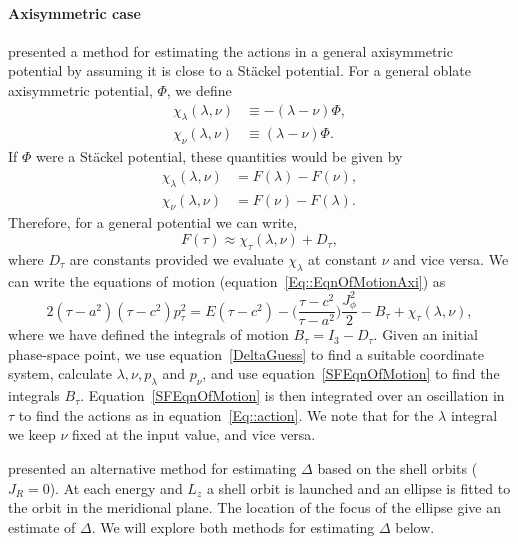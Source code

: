 \documentclass[useAMS,usenatbib,fleqn,a4paper]{mn2e}
\begin{document}
\paragraph{Axisymmetric case}\label{Method::SF_Axi}
\cite{Binney2012} presented a method for estimating the actions in a general axisymmetric potential by assuming it is close to a St\"ackel potential. For a general oblate axisymmetric potential, $\Phi$, we define
\begin{equation}
\begin{split}
\chi_\lambda(\lambda,\nu) &\equiv -(\lambda-\nu)\Phi,\\
\chi_\nu(\lambda,\nu) &\equiv (\lambda-\nu)\Phi.
\end{split}
\end{equation}
If $\Phi$ were a St\"ackel potential, these quantities would be given by
\begin{equation}
\begin{split}
\chi_\lambda(\lambda,\nu) &= F(\lambda)-F(\nu),\\
\chi_\nu(\lambda,\nu) &= F(\nu)-F(\lambda).
\end{split}
\end{equation}
Therefore, for a general potential we can write,
\begin{equation}
F(\tau) \approx \chi_\tau(\lambda,\nu)+D_\tau,
\end{equation}
where $D_\tau$ are constants provided we evaluate $\chi_\lambda$ at constant $\nu$ and vice versa. We can write the equations of motion (equation~\eqref{Eq::EqnOfMotionAxi}) as
\begin{equation}
2(\tau-a^2)(\tau-c^2)p_\tau^2 = E(\tau-c^2)-\Big(\frac{\tau-c^2}{\tau-a^2}\Big)\frac{J_\phi^2}{2}-B_\tau+\chi_\tau(\lambda,\nu),
\label{SFEqnOfMotion}
\end{equation}
where we have defined the integrals of motion $B_\tau = I_3-D_\tau$. Given an initial phase-space point, we use equation~\eqref{DeltaGuess} to find a suitable coordinate system, calculate $\lambda,\nu,p_\lambda$ and $p_\nu$, and use equation~\eqref{SFEqnOfMotion} to find the integrals $B_\tau$. Equation~\eqref{SFEqnOfMotion} is then integrated over an oscillation in $\tau$ to find the actions as in equation~\eqref{Eq::action}. We note that for the $\lambda$ integral we keep $\nu$ fixed at the input value, and vice versa.

\cite{Binney2014} presented an alternative method for estimating $\Delta$ based on the shell orbits ($J_R=0$). At each energy and $L_z$ a shell orbit is launched and an ellipse is fitted to the orbit in the meridional plane. The location of the focus of the ellipse give an estimate of $\Delta$. We will explore both methods for estimating $\Delta$ below.
\end{document}

